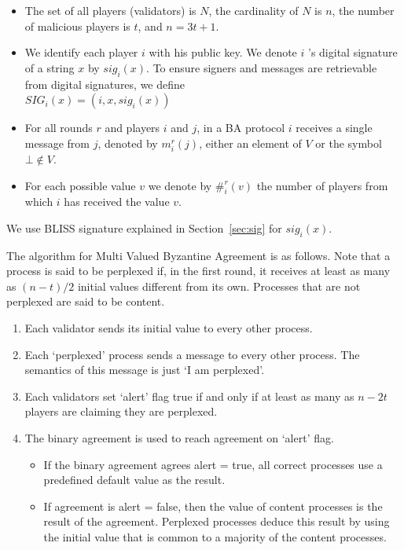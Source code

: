 \documentclass[a4paper,10pt,twocolumn]{article}
\begin{document}
	 \begin{itemize}
		\setlength\itemsep{0em}
		\item  The set of all players (validators) is \(N\),  the cardinality of \(N\) is \(n\),  the number of malicious players is \(t\),
		 and \( n= 3t+ 1\).
		 \item We identify each player \( i \) with his public key.  We denote \(i\) ’s digital signature of a string \(x\) by \(sig_{i}(x) \).
		  To ensure signers and messages are retrievable from digital signatures, we define \\
				\( SIG_{i} (x) = (i,x,sig_i(x) )\)
		  \item For all rounds \(r\) and players \(i\) and \(j\), in a BA protocol \(i\) receives a single message from \(j\), denoted by \(m^r_i(j)\),
  				either an element of \(V \) or the symbol \( \bot \notin V \).
  		  \item For each possible value \(v\) we denote by \( \#^{r}_{i}(v) \) the number of players from which \(i\) has received the value \(v\).
	 \end{itemize}

	 We use BLISS signature explained in Section~\ref{sec:sig} for \(sig_{i}(x) \). 
	
	 \vspace{2.5mm}

	 The algorithm for Multi Valued Byzantine Agreement is as follows. Note that 
	 a process is said to be perplexed if, in the first round, it receives at least as many as \( (n - t) /2 \) initial values different from its own.
	 Processes that are not perplexed are said to be content. 
	 \begin{enumerate}
		\setlength\itemsep{0em}
		 \item Each validator sends its initial value  to every other process. 
		 \item Each `perplexed' process sends a message to every other process. The semantics of this message is just `I am perplexed'.
		 \item Each validators set `alert' flag true if and only if at least as many as \(n-2t\) players  are claiming they are perplexed.
		 \item The binary agreement is used to reach agreement on `alert' flag.
\begin{itemize}
	\setlength\itemsep{0em}
	\item If the binary agreement agrees alert = true, all correct processes use a predefined default value as the result.
		 \item If agreement is alert = false, then the value of content processes  is the result of the agreement.
		 Perplexed processes deduce this result by using the initial value that is common to a majority of the content processes. 
\end{itemize}
	 \end{enumerate}
	
\end{document}
